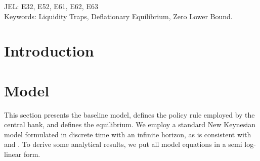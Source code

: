 \documentclass[11pt]{article}
\begin{document}
	\vspace{5em}
	
	\noindent JEL: E32, E52, E61, E62, E63\\
	
	\noindent Keywords: Liquidity Traps, Deflationary Equilibrium, Zero Lower Bound.
	
	\newpage
	
	\section{Introduction}
	\label{S:Introduction}
	
	
	\section{Model}
	\label{S:Model}
	
	This section presents the baseline model, defines the policy rule employed by the central bank, and defines the equilibrium. We employ a standard New Keynesian model formulated in discrete time with an infinite horizon, as is consistent with \citet{Woodford2003Book} and \citet{Gali2015Book}. To derive some analytical results, we put all model equations in a semi log-linear form.
	
\end{document}

